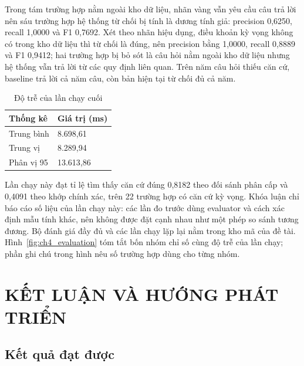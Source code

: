 \documentclass[12pt,a4paper,oneside]{report}
\begin{document}
Trong tám trường hợp nằm ngoài kho dữ liệu, nhãn vàng vẫn yêu cầu câu trả lời nên sáu trường hợp hệ thống từ chối bị tính là dương tính giả: precision 0,6250, recall 1,0000 và F1 0,7692. Xét theo nhãn hiệu dụng, điều khoản kỳ vọng không có trong kho dữ liệu thì từ chối là đúng, nên precision bằng 1,0000, recall 0,8889 và F1 0,9412; hai trường hợp bị bỏ sót là câu hỏi nằm ngoài kho dữ liệu nhưng hệ thống vẫn trả lời từ các quy định liên quan. Trên năm câu hỏi thiếu căn cứ, baseline trả lời cả năm câu, còn bản hiện tại từ chối đủ cả năm.

\begin{table}[H]
  \caption{Độ trễ của lần chạy cuối}
  \label{tab:evaluation-latency}
  \centering
  \begin{tabularx}{\textwidth}{|L{6.0cm}|Z|}
    \hline
    \textbf{Thống kê} & \textbf{Giá trị (ms)}    \\
    \hline
    Trung bình        & 8.698,61   \\
    \hline
    Trung vị          & 8.289,94   \\
    \hline
    Phân vị 95        & 13.613,86  \\
    \hline
  \end{tabularx}
\end{table}

Lần chạy này đạt tỉ lệ tìm thấy căn cứ đúng 0,8182 theo đối sánh phân cấp và 0,4091 theo khớp chính xác, trên 22 trường hợp có căn cứ kỳ vọng. Khóa luận chỉ báo cáo số liệu của lần chạy này: các lần đo trước dùng evaluator và cách xác định mẫu tính khác, nên không được đặt cạnh nhau như một phép so sánh tương đương. Bộ đánh giá đầy đủ và các lần chạy lặp lại nằm trong kho mã của đề tài.
Hình~\ref{fig:ch4_evaluation} tóm tắt bốn nhóm chỉ số cùng độ trễ của lần chạy; phần ghi chú trong hình nêu số trường hợp dùng cho từng nhóm.

\chapter*{KẾT LUẬN VÀ HƯỚNG PHÁT TRIỂN}

\section*{Kết quả đạt được}
{}
\end{document}
